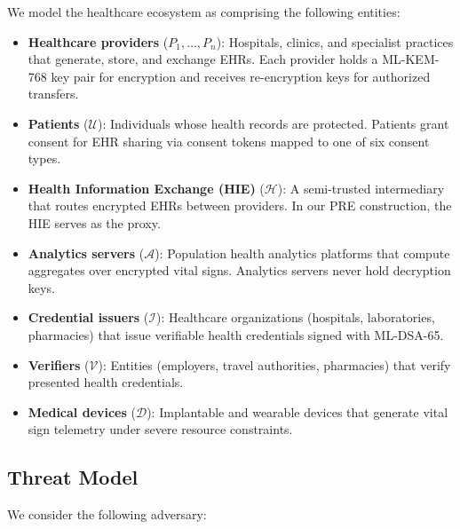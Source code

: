 \documentclass[conference,10pt]{IEEEtran}
\newcommand{\mlkem}{\textsf{ML-KEM}}
\newcommand{\mldsa}{\textsf{ML-DSA}}
\begin{document}
We model the healthcare ecosystem as comprising the following entities:

\begin{itemize}[leftmargin=*]
    \item \textbf{Healthcare providers} ($P_1, \ldots, P_n$): Hospitals, clinics, and specialist practices that generate, store, and exchange EHRs. Each provider holds a \mlkem{}-768 key pair for encryption and receives re-encryption keys for authorized transfers.

    \item \textbf{Patients} ($\mathcal{U}$): Individuals whose health records are protected. Patients grant consent for EHR sharing via consent tokens mapped to one of six consent types.

    \item \textbf{Health Information Exchange (HIE)} ($\mathcal{H}$): A semi-trusted intermediary that routes encrypted EHRs between providers. In our PRE construction, the HIE serves as the proxy.

    \item \textbf{Analytics servers} ($\mathcal{A}$): Population health analytics platforms that compute aggregates over encrypted vital signs. Analytics servers never hold decryption keys.

    \item \textbf{Credential issuers} ($\mathcal{I}$): Healthcare organizations (hospitals, laboratories, pharmacies) that issue verifiable health credentials signed with \mldsa{}-65.

    \item \textbf{Verifiers} ($\mathcal{V}$): Entities (employers, travel authorities, pharmacies) that verify presented health credentials.

    \item \textbf{Medical devices} ($\mathcal{D}$): Implantable and wearable devices that generate vital sign telemetry under severe resource constraints.
\end{itemize}

\subsection{Threat Model}

We consider the following adversary:
\end{document}
